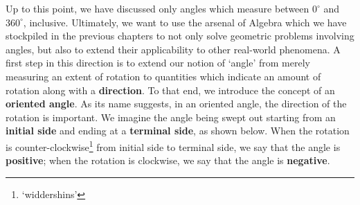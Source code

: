 \documentclass{ximera}
\begin{document}
Up to this point, we have discussed only angles which measure between $0^{\circ}$ and $360^{\circ}$, inclusive.  Ultimately, we want to use the arsenal of Algebra which we have stockpiled in the previous chapters to not only solve geometric problems involving angles, but also to extend their applicability to other real-world phenomena.  A first step in this direction is to extend our notion of `angle' from merely measuring an extent of rotation to quantities which indicate an amount of rotation along with a \textbf{direction}.  To that end, we introduce the concept of an \textbf{oriented angle}.  As its name suggests, in an oriented angle, the direction of the rotation is important.  We imagine the angle being swept out starting from an \textbf{initial side} and ending at a \textbf{terminal side}, as shown below.  When the rotation is counter-clockwise\footnote{`widdershins'} from initial side to terminal side, we say that the angle is \textbf{positive}; when the rotation is clockwise, we say that the angle is \textbf{negative}.
\end{document}
